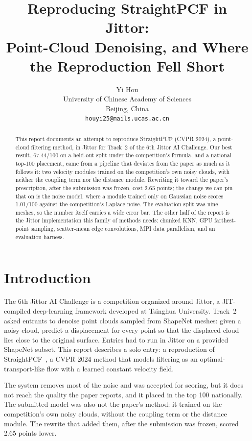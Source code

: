 \documentclass{article}
\title{Reproducing StraightPCF in Jittor:\\
Point-Cloud Denoising, and Where the Reproduction Fell Short}
\author{%
  Yi Hou \\
  University of Chinese Academy of Sciences\\
  Beijing, China \\
  \texttt{houyi25@mails.ucas.ac.cn}
}
\begin{document}
\maketitle

\begin{abstract}
This report documents an attempt to reproduce StraightPCF (CVPR 2024), a point-cloud filtering method, in Jittor for Track~2 of the 6th Jittor AI Challenge. Our best result, 67.44/100 on a held-out split under the competition's formula, and a national top-100 placement, came from a pipeline that deviates from the paper as much as it follows it: two velocity modules trained on the competition's own noisy clouds, with neither the coupling term nor the distance module. Rewriting it toward the paper's prescription, after the submission was frozen, cost 2.65 points; the change we can pin that on is the noise model, where a module trained only on Gaussian noise scores 1.01/100 against the competition's Laplace noise. The evaluation split was nine meshes, so the number itself carries a wide error bar. The other half of the report is the Jittor implementation this family of methods needs: chunked KNN, GPU farthest-point sampling, scatter-mean edge convolutions, MPI data parallelism, and an evaluation harness.
\end{abstract}

\section{Introduction}

The 6th Jittor AI Challenge is a competition organized around Jittor, a JIT-compiled deep-learning framework developed at Tsinghua University. Track~2 asked entrants to denoise point clouds sampled from ShapeNet meshes: given a noisy cloud, predict a displacement for every point so that the displaced cloud lies close to the original surface. Entries had to run in Jittor on a provided ShapeNet subset. This report describes a solo entry: a reproduction of StraightPCF~\citep{straightpcf}, a CVPR 2024 method that models filtering as an optimal-transport-like flow with a learned constant velocity field.

The system removes most of the noise and was accepted for scoring, but it does not reach the quality the paper reports, and it placed in the top 100 nationally. The submitted model was also not the paper's method: it trained on the competition's own noisy clouds, without the coupling term or the distance module. The rewrite that added them, after the submission was frozen, scored 2.65 points lower.
\end{document}
